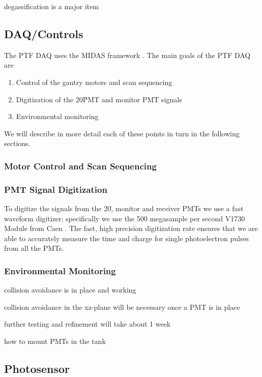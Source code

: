 degassification is a major item


\subsection{DAQ/Controls}
\label{Sec:DAQ_Controls}

The PTF DAQ uses the MIDAS framework \cite{MIDASRef}.  The main goals of the PTF DAQ are

\begin{enumerate}
\item Control of the gantry motors and scan sequencing
\item Digitization of the 20\" PMT and monitor PMT signals 
\item Environmental monitoring
\end{enumerate}

We will describe in more detail each of these points in turn in the following sections.

\subsubsection{Motor Control and Scan Sequencing}


\subsubsection{PMT Signal Digitization}

To digitize the signals from the 20\", monitor and receiver PMTs we use a fast waveform digitizer; specifically
we use the 500 megasample per second V1730 Module from Caen \cite{V1730Ref}.  The fast, high precision digitization rate ensures that we
are able to accurately measure the time and charge for single photoelectron pulses from all the PMTs.


\subsubsection{Environmental Monitoring}




collision avoidance is in place and working

collision avoidance in the xz-plane will be necessary once a PMT is in place

further testing and refinement will take about 1 week

how to mount PMTs in the tank




\subsection{Photosensor}

